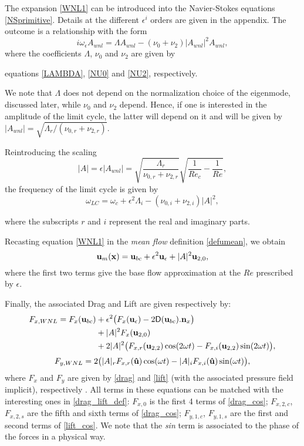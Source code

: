 \documentclass[twocolumn,10pt]{asme2ej}
\newcommand{\be}[1]{ \begin{equation} \label{#1}}
\newcommand{\ee}{\end{equation}}
\begin{document}
{\color{red}
The expansion \ref{WNL1} can be introduced into the Navier-Stokes equations \ref{NSprimitive}. Details at the different $\epsilon^i$ orders are given in the appendix}. The outcome is a relationship with the form
\be{WNL3}
i \omega_\epsilon A_{wnl} = \Lambda A_{wnl} - (\nu_0+\nu_2)  |A_{wnl}|^2 A_{wnl},
\ee
where the coefficients $\Lambda$, $\nu_0$ and $\nu_2$ are given by {\color{red}equations \ref{LAMBDA}, \ref{NU0} and \ref{NU2}, respectively.

We note that $\Lambda$ does not depend on the normalization choice of the eigenmode, discussed later, while $\nu_0$ and $\nu_2$ depend. Hence, if one is interested in the amplitude of the limit cycle, the latter will depend on it and will be given by $|A_{wnl}| = \sqrt{\Lambda_r/(\nu_{0,r}+\nu_{2,r})}$.

Reintroducing the scaling
\be{ANL} 
|A| =  \epsilon |A_{wnl}| =\sqrt{ \frac{\Lambda_r}{\nu_{0,r}+\nu_{2,r} }} \sqrt{\frac{1}{Re_c}-\frac{1}{Re}},
\ee
the frequency of the limit cycle is given by
\be{omegaWNL} 
\omega_{LC}=\omega_c+ \epsilon^2\Lambda_i- (\nu_{0,i}+\nu_{2,i})|A|^2,
\ee 

where the subscripts $r$ and $i$ represent the real and imaginary parts.
}
{\color{red}
Recasting equation \ref{WNL1} in the {\em mean flow} definition \ref{defumean}, we obtain
\be{mean_flow_WNL}
{\bf u}_m({\bf x })= {\bf u}_{bc}+\epsilon^2 {\bf u}_\epsilon + |A|^2{\bf u}_{2,0},
\ee
where the first two terms give the base flow approximation at the $Re$ prescribed by $\epsilon$. }

{\color{red} Finally, the associated Drag and Lift are given respectively by:
\be{drag_cos}
\begin{aligned}
F_{x,WNL} = F_{x}({\bf u}_{bc})&+\epsilon^2 \big( 
F_{x}({\bf u}_{\epsilon})- 2\mathsf{D}({\bf u}_{bc}).{\bf n}_x \big)\\
&+|A|^2 F_{x}({\bf u}_{2,0})\\
&+2|A|^2\big(F_{x,r}({\bf u}_{2,2})\cos(2\omega t)
-F_{x,i}({\bf u}_{2,2})\sin(2\omega t) \big),
\end{aligned}
\ee
\be{lift_cos}
\begin{aligned}
F_{y,WNL} =2\big(|A|_r F_{x,r}({\bf \hat{u}})\cos(\omega t)-
|A|_i F_{x,i}({\bf \hat{u}})\sin(\omega t) \big),\\
\end{aligned}
\ee
where $F_{x}$ and $F_{y}$ are given by \ref{drag} and \ref{lift} (with the associated pressure field implicit), respectively . All terms in these equations can be matched with the interesting ones in \ref{drag_lift_def}: $F_{x,0}$ is the first 4 terms of \ref{drag_cos}; $F_{x,2,c}$, $F_{x,2,s}$ are the fifth and sixth terms of \ref{drag_cos}; $F_{y,1,c}$, $F_{y,1,s}$ are the first and second terms of \ref{lift_cos}. We note that the \textit{sin} term is associated to the phase of the forces in a physical way. }
\end{document}
